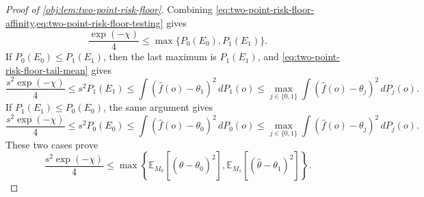 \documentclass[11pt]{article}
\begin{document}
\begin{proof}[Proof of \cref{obj:lem:two-point-risk-floor}]
Combining \cref{eq:two-point-risk-floor-affinity,eq:two-point-risk-floor-testing} gives
\[
\frac{\exp(-\chi)}{4}\le \max\{P_0(E_0),P_1(E_1)\}.
\]
If \(P_0(E_0)\le P_1(E_1)\), then the last maximum is \(P_1(E_1)\), and \cref{eq:two-point-risk-floor-tail-mean} gives
\[
\frac{s^2\exp(-\chi)}{4}
\le
s^2P_1(E_1)
\le
\int(\widehat f(o)-\theta_1)^2\,dP_1(o)
\le
\max_{j\in\{0,1\}}
\int(\widehat f(o)-\theta_j)^2\,dP_j(o).
\]
If \(P_1(E_1)\le P_0(E_0)\), the same argument gives
\[
\frac{s^2\exp(-\chi)}{4}
\le
s^2P_0(E_0)
\le
\int(\widehat f(o)-\theta_0)^2\,dP_0(o)
\le
\max_{j\in\{0,1\}}
\int(\widehat f(o)-\theta_j)^2\,dP_j(o).
\]
These two cases prove
\begin{equation}\label{eq:two-point-risk-floor-fixed-models}
\frac{s^2\exp(-\chi)}{4}
\le
\max\left\{
\mathbb E_{M_0}\!\left[(\widehat\theta-\theta_0)^2\right],
\mathbb E_{M_1}\!\left[(\widehat\theta-\theta_1)^2\right]
\right\}.
\end{equation} %


\end{proof}
\end{document}
